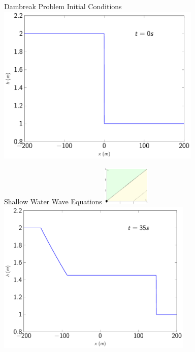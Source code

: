 \documentclass[pdf]{beamer}
\begin{document}
\begin{frame}{Dambreak Problem Initial Conditions}
\centering
\includegraphics[width=0.73\textwidth]{./Pics/Tex/Results/DB/Init/Init.pdf}
\end{frame}

\begin{frame}{Shallow Water Wave Equations \hfill \includegraphics[width=0.17\textwidth]{./Pics/Tex/Explanatory/RegionsPlot/SPSWWE.pdf}}
\centering
\includegraphics[width=0.7\textwidth]{./Pics/Tex/Results/DB/SWWE/SWWE.pdf}
\end{frame}
\end{document}

